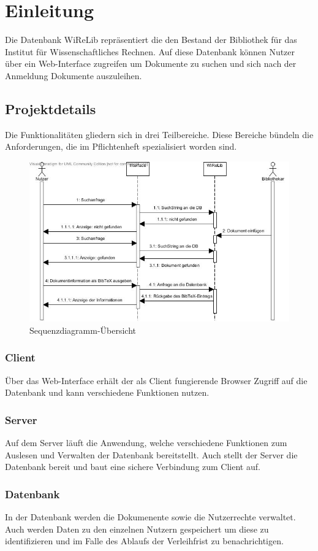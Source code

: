 
\chapter{Einleitung}
Die Datenbank WiReLib repräsentiert die den Bestand der Bibliothek für das Institut für Wissenschaftliches Rechnen.
Auf diese Datenbank können Nutzer über ein Web-Interface zugreifen um Dokumente zu suchen und sich nach der Anmeldung Dokumente auszuleihen.

\section{Projektdetails}
Die Funktionalitäten gliedern sich in drei Teilbereiche.
Diese Bereiche bündeln die Anforderungen, die im Pflichtenheft spezialisiert
worden sind.

\begin{figure}[h]
\includegraphics[width=0.8\linewidth]{bilder/sequenz-uebersicht.jpg}
\caption[Sequenzdiagramm-Übersicht]{Sequenzdiagramm-Übersicht}
\label{fig:Seqü}
\end{figure}

\subsection{Client}
Über das Web-Interface erhält der als Client fungierende Browser Zugriff auf die Datenbank und kann verschiedene Funktionen nutzen.

\subsection{Server}
Auf dem Server läuft die Anwendung, welche verschiedene Funktionen zum Auslesen und Verwalten der Datenbank bereitstellt. 
Auch stellt der Server die Datenbank bereit und baut eine sichere Verbindung zum Client auf.

\subsection{Datenbank}
In der Datenbank werden die Dokumenente sowie die Nutzerrechte verwaltet.
Auch werden Daten zu den einzelnen Nutzern gespeichert um diese zu identifizieren und im Falle des Ablaufs der Verleihfrist zu benachrichtigen.
